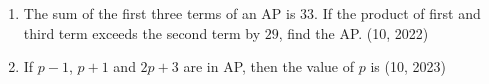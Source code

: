 \begin{enumerate}[label=\thesubsection.\arabic*,ref=\thesubsection.\theenumi,itemsep=1pt]
 \item The sum of the first three terms of an AP is $33$. If the product of first and third term exceeds the second term by $29$, find the AP.
         \hfill (10, 2022)    
 \item If $p-1$, $p+1$ and $2p+3$ are in AP, then the value of $p$ is
        \hfill (10, 2023)
        \begin{enumerate}
      \end{enumerate}
\end{enumerate}
%
